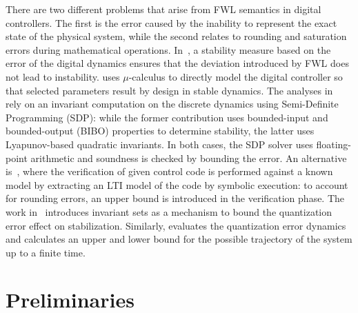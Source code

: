 \documentclass[twocolumn]{autart}    %
\renewcommand{\note}[1]{\textcolor{red}{[#1]}}
\begin{document}
There are two different problems that arise from FWL semantics in digital controllers.  The first
is the error caused by the inability to represent the exact
state of the physical system, while the second relates to rounding and
saturation errors during mathematical operations.  
In~\cite{fialho1994stability}, a stability measure based on the error of the digital dynamics ensures that
the deviation introduced by FWL does not lead to instability.  
\cite{DBLP:journals/automatica/WuLCC09} uses $\mu$-calculus to directly model the digital controller so that selected
parameters result by design in stable dynamics.  
The analyses in~\cite{DBLP:conf/hybrid/RouxJG15, DBLP:conf/hybrid/WangGRJF16} rely on an
invariant computation on the discrete dynamics using Semi-Definite
Programming (SDP):  while the former contribution uses bounded-input and bounded-output
(BIBO) properties to determine stability, the latter uses Lyapunov-based
quadratic invariants.  In both cases, the SDP solver uses floating-point
arithmetic and soundness is checked by bounding the error.  
An alternative is~\cite{park2016scalable}, where the verification of given control code is
performed against a known model by extracting an LTI model of the code by
symbolic execution: to account for rounding errors, an upper bound is
introduced in the verification phase.  
The work in~\cite{picasso2003stabilization} introduces invariant sets as a mechanism to
bound the quantization error effect on stabilization.  
Similarly, 
\cite{liberzon2003hybrid} evaluates the quantization error dynamics and calculates an upper and lower
bound for the possible trajectory of the system up to a finite time. 


\section{Preliminaries}
\label{sec:model}

\end{document}
